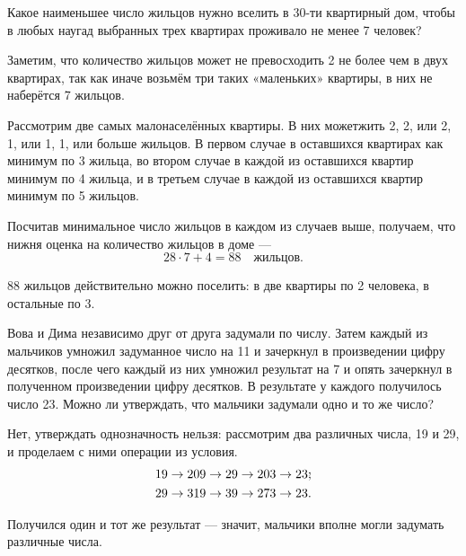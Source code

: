 
\begin{itemize}

	\itA Какое наименьшее число жильцов нужно вселить в 30-ти квартирный дом, чтобы в любых наугад выбранных трех квартирах проживало не менее 7 человек?
	
	\itr Заметим, что количество жильцов может не превосходить 2 не более чем в двух квартирах, так как иначе возьмём три таких «маленьких» квартиры, в них не наберётся 7 жильцов.
	
	Рассмотрим две самых малонаселённых квартиры. В них может\linebreak жить 2, 2, или 2, 1, или 1, 1, или больше жильцов. В первом случае в оставшихся квартирах как минимум по 3 жильца, во втором случае в каждой из оставшихся квартир минимум по 4 жильца, и в третьем случае в каждой из оставшихся квартир минимум по 5 жильцов. 
	
	Посчитав минимальное число жильцов в каждом из случаев выше, получаем, что нижня оценка на количество жильцов в доме —
	$$28 \cdot 7 + 4 = 88\quad\text{жильцов.}$$
	
	88 жильцов действительно можно поселить: в две квартиры по 2 человека, в остальные по 3.

	\itB Вова и Дима независимо друг от друга задумали по числу. Затем каждый из мальчиков умножил задуманное число на 11 и зачеркнул в произведении цифру десятков, после чего каждый из них умножил результат на 7 и опять зачеркнул в полученном произведении цифру десятков. В результате у каждого получилось число 23. Можно ли утверждать, что мальчики задумали одно и то же число?
	
	\itr Нет, утверждать однозначность нельзя: рассмотрим два различных числа, 19 и 29, и проделаем с ними операции из условия.
\begin{align*}
	& 19 \rightarrow 209 \rightarrow  29 \rightarrow 203 \rightarrow 23\scolon \\
	& 29 \rightarrow 319 \rightarrow 39 \rightarrow 273 \rightarrow 23.
\end{align*}

	Получился один и тот же результат — значит, мальчики вполне могли задумать различные числа.

\end{itemize}



